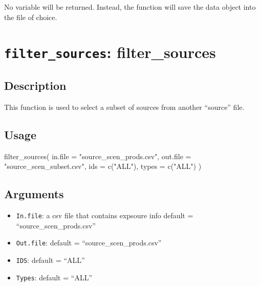 \documentclass[
]{article}
\newenvironment{Shaded}{\begin{snugshade}}{\end{snugshade}}
\newcommand{\AttributeTok}[1]{\textcolor[rgb]{0.77,0.63,0.00}{#1}}
\newcommand{\FunctionTok}[1]{\textcolor[rgb]{0.00,0.00,0.00}{#1}}
\newcommand{\NormalTok}[1]{#1}
\newcommand{\StringTok}[1]{\textcolor[rgb]{0.31,0.60,0.02}{#1}}
\providecommand{\tightlist}{%
  \setlength{\itemsep}{0pt}\setlength{\parskip}{0pt}}
\begin{document}
No variable will be returned. Instead, the function will save the data
object into the file of choice.

\hypertarget{filter_sources-filter_sources}{%
\section{\texorpdfstring{\texttt{filter\_sources}:
filter\_sources}{filter\_sources: filter\_sources}}\label{filter_sources-filter_sources}}

\hypertarget{description-21}{%
\subsection{Description}\label{description-21}}

This function is used to select a subset of sources from another
``source'' file.

\hypertarget{usage-21}{%
\subsection{Usage}\label{usage-21}}

\begin{Shaded}
\begin{Highlighting}[]
\FunctionTok{filter\_sources}\NormalTok{(}
  \AttributeTok{in.file =} \StringTok{"source\_scen\_prods.csv"}\NormalTok{,}
  \AttributeTok{out.file =} \StringTok{"source\_scen\_subset.csv"}\NormalTok{,}
  \AttributeTok{ids =} \FunctionTok{c}\NormalTok{(}\StringTok{"ALL"}\NormalTok{),}
  \AttributeTok{types =} \FunctionTok{c}\NormalTok{(}\StringTok{"ALL"}\NormalTok{)}
\NormalTok{)}
\end{Highlighting}
\end{Shaded}

\hypertarget{arguments-18}{%
\subsection{Arguments}\label{arguments-18}}

\begin{itemize}
\tightlist
\item
  \texttt{In.file}: a csv file that contains expsoure info default =
  ``source\_scen\_prods.csv''
\item
  \texttt{Out.file}: default = ``source\_scen\_prods.csv''
\item
  \texttt{IDS}: default = ``ALL''
\item
  \texttt{Types}: default = ``ALL''
\end{itemize}
\end{document}
